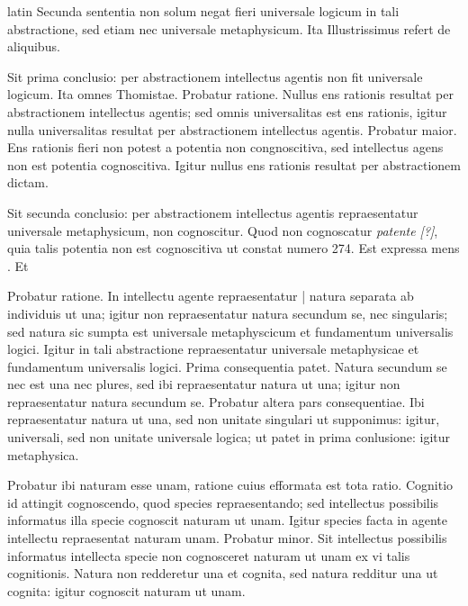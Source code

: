 \begin{otherlanguage*}{latin}
\pstart
  Secunda sententia non solum negat fieri universale logicum in tali abstractione, sed etiam nec universale metaphysicum. Ita Illustrissimus  refert de aliquibus. 
\pend

\pstart
  Sit prima conclusio: per abstractionem intellectus agentis non fit universale logicum. Ita omnes Thomistae. Probatur ratione. Nullus ens rationis resultat per abstractionem intellectus agentis; sed omnis universalitas est ens rationis, igitur nulla universalitas resultat per abstractionem intellectus agentis. Probatur maior. Ens rationis fieri non potest a potentia non congnoscitiva, sed intellectus agens non est potentia cognoscitiva. Igitur nullus ens rationis resultat per abstractionem dictam. 
\pend

\pstart
  Sit secunda conclusio: per abstractionem intellectus agentis repraesentatur universale metaphysicum, non cognoscitur. Quod non cognoscatur \emph{patente [?]}, quia talis potentia non est cognoscitiva ut constat numero 274. Est expressa mens . Et  
\pend

\pstart
  Probatur ratione. In intellectu agente repraesentatur \textnormal{|} natura separata ab individuis ut una; igitur non repraesentatur natura secundum se, nec singularis; sed natura sic sumpta est universale metaphyscicum et fundamentum universalis logici. Igitur in tali abstractione repraesentatur universale metaphysicae et fundamentum universalis logici. Prima consequentia patet. Natura secundum se nec est una nec plures, sed ibi repraesentatur natura ut una; igitur non repraesentatur natura secundum se. Probatur altera pars consequentiae. Ibi repraesentatur natura ut una, sed non unitate singulari ut supponimus: igitur, universali, sed non unitate universale logica; ut patet in prima conlusione: igitur metaphysica. 
\pend

\pstart
  Probatur ibi naturam esse unam, ratione cuius efformata est tota ratio. Cognitio id attingit cognoscendo, quod species repraesentando; sed intellectus possibilis informatus illa specie cognoscit naturam ut unam. Igitur species facta in agente intellectu repraesentat naturam unam. Probatur minor. Sit intellectus possibilis informatus intellecta specie non cognosceret naturam ut unam ex vi talis cognitionis. Natura non redderetur una et cognita, sed natura redditur una ut cognita: igitur cognoscit naturam ut unam. 
\pend


\end{otherlanguage*}
